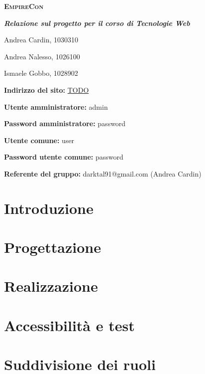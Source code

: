 \documentclass[12pt,a4paper]{article}
\begin{document}
\begin{titlepage}
	\centering
	\vspace*{1cm}
	{\scshape\LARGE \textbf{EmpireCon} \par}
	\vspace{0.5cm}
	{\Large \textbf{\textit{Relazione sul progetto per il corso di Tecnologie Web}}\par}
	\vspace{3cm}
	{\Large Andrea Cardin, 1030310\par}
	{\Large Andrea Nalesso, 1026100\par}
	{\Large Ismaele Gobbo, 1028902\par}
	\vspace{6cm}
	{\normalsize \textbf{Indirizzo del sito:} \url{TODO}\par}
	{\normalsize \textbf{Utente amministratore:} admin\par}
	{\normalsize \textbf{Password amministratore:} password\par}
	{\normalsize \textbf{Utente comune:} user\par}
	{\normalsize \textbf{Password utente comune:} password\par}
	{\normalsize \textbf{Referente del gruppo:} darktal91@gmail.com (Andrea Cardin)\par}
	\vspace*{\fill}
\end{titlepage}

\tableofcontents
\newpage

% 
% 

\section{Introduzione}


\section{Progettazione}


\section{Realizzazione}


\section{Accessibilità e test}




\section{Suddivisione dei ruoli}

\end{document}
